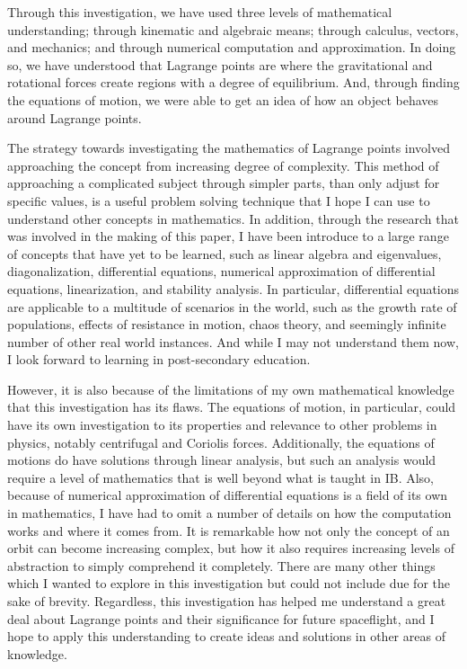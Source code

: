 Through this investigation, we have used three levels of mathematical understanding; through kinematic and algebraic means; through calculus, vectors, and mechanics; and through numerical computation and approximation.
In doing so, we have understood that Lagrange points are where the gravitational and rotational forces create regions with a degree of equilibrium.
And, through finding the equations of motion, we were able to get an idea of how an object behaves around Lagrange points.

The strategy towards investigating the mathematics of Lagrange points involved approaching the concept from increasing degree of complexity.
This method of approaching a complicated subject through simpler parts, than only adjust for specific values, is a useful problem solving technique that I hope I can use to understand other concepts in mathematics.
In addition, through the research that was involved in the making of this paper, I have been introduce to a large range of concepts that have yet to be learned, such as linear algebra and eigenvalues, diagonalization, differential equations, numerical approximation of differential equations, linearization, and stability analysis.
In particular, differential equations are applicable to a multitude of scenarios in the world, such as the growth rate of populations, effects of resistance in motion, chaos theory, and seemingly infinite number of other real world instances.
And while I may not understand them now, I look forward to learning in post-secondary education.

However, it is also because of the limitations of my own mathematical knowledge that this investigation has its flaws.
The equations of motion, in particular, could have its own investigation to its properties and relevance to other problems in physics, notably centrifugal and Coriolis forces.
Additionally, the equations of motions do have solutions through linear analysis, but such an analysis would require a level of mathematics that is well beyond what is taught in IB.
Also, because of numerical approximation of differential equations is a field of its own in mathematics, I have had to omit a number of details on how the computation works and where it comes from.
It is remarkable how not only the concept of an orbit can become increasing complex, but how it also requires increasing levels of abstraction to simply comprehend it completely.
There are many other things which I wanted to explore in this investigation but could not include due for the sake of brevity.
Regardless, this investigation has helped me understand a great deal about Lagrange points and their significance for future spaceflight, and I hope to apply this understanding to create ideas and solutions in other areas of knowledge.
